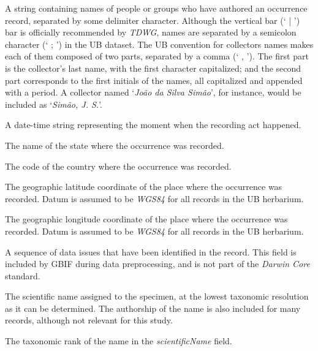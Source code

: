 \begin{description}[align=left,labelindent=1cm]
\item [recordedBy.] A string containing names of people or groups who have authored an occurrence record, separated by some delimiter character. 
Although the vertical bar (` | ') bar is officially recommended by \textit{TDWG}, names are separated by a semicolon character (` ; ') in the UB dataset. 
The UB convention for collectors names makes each of them composed of two parts, separated by a comma (` , ').
The first part is the collector's last name, with the first character capitalized; and the second part corresponds to the first initials of the names, all capitalized and appended with a period.
A collector named `\textit{João da Silva Simão}', for instance, would be included as `\textit{Simão, J. S.}'.
%
\item [eventDate.] A date-time string representing the moment when the recording act happened.
%
\item [stateProvince.] The name of the state where the occurrence was recorded.

\item [countryCode.] The code of the country where the occurrence was recorded.

\item [decimalLatitude.] The geographic latitude coordinate of the place where the occurrence was recorded. 
Datum is assumed to be \textit{WGS84} for all records in the UB herbarium.

\item [decimalLongitude.] The geographic longitude coordinate of the place where the occurrence was recorded.
Datum is assumed to be \textit{WGS84} for all records in the UB herbarium.

\item [issue.] A sequence of data issues that have been identified in the record.
This field is included by GBIF during data preprocessing, and is not part of the \textit{Darwin Core} standard.%

\item [scientificName.] The scientific name assigned to the specimen, at the lowest taxonomic resolution as it can be determined. The authorship of the name is also included for many records, although not relevant for this study.

\item [taxonRank.] The taxonomic rank of the name in the \textit{scientificName} field.
\end{description}

